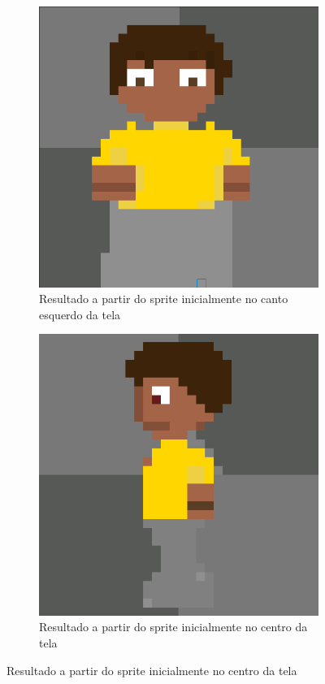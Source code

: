 \begin{figure}[htbp]
    \centering
    \caption{\small Comparação rotação 90 graus no Pixel Lab}
    \label{fig:pixelLabRotCompara}
    \begin{subfigure}{0.45\linewidth}
        \centering
        \includegraphics[width=0.5\linewidth]{figs/pixelLab/dia1/resultado rotacao 2.PNG}
        \caption{\small Resultado a partir do sprite inicialmente no canto esquerdo da tela}
        \label{fig:pixelLabRotComparaCanto}
    \end{subfigure}
    \begin{subfigure}{0.45\linewidth}
        \centering
        \includegraphics[width=0.5\linewidth]{figs/pixelLab/dia2/rot90res1.PNG}
        \caption{\small Resultado a partir do sprite inicialmente no centro da tela}
        \label{fig:pixelLabRotComparaCentro}
    \end{subfigure}

\end{figure}

